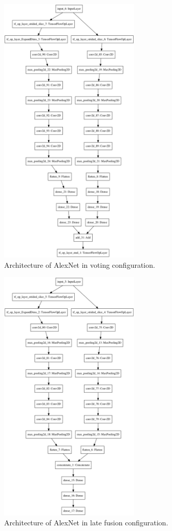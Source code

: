 \documentclass{l4proj}
\begin{document}
\begin{appendices}
\begin{figure}[ht]
  \centering
  \includegraphics[width=0.6\textwidth]{images/models/keras/voting.png}
  \caption{Architecture of AlexNet in voting configuration.}
\end{figure}

\begin{figure}[ht]
  \centering
  \includegraphics[width=0.6\textwidth]{images/models/keras/fusion.png}
  \caption{Architecture of AlexNet in late fusion configuration.}
\end{figure}


\end{appendices}
\end{document}

